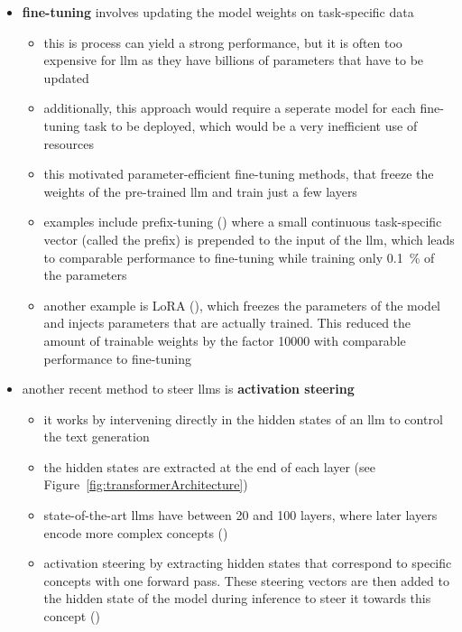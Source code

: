\begin{itemize}
\begin{itemize}
        \end{itemize}
  \item \textbf{fine-tuning} involves updating the model weights on task-specific data
        \begin{itemize}
          \item this is process can yield a strong performance, but it is often too expensive for \acs{llm} as they have billions of parameters that have to be updated
          \item additionally, this approach would require a seperate model for each fine-tuning task to be deployed, which would be a very inefficient use of resources
          \item this motivated parameter-efficient fine-tuning methods, that freeze the weights of the pre-trained \ac{llm} and train just a few layers
          \item examples include prefix-tuning (\cite{liPrefixtuningOptimizingContinuous2021}) where a small continuous task-specific vector (called the prefix) is prepended to the input of the \ac{llm}, which leads to comparable performance to fine-tuning while training only \SI{0.1}{\percent} of the parameters
          \item another example is LoRA (\cite{huLoRALowrankAdaptation2021}), which freezes the parameters of the model and injects parameters that are actually trained. This reduced the amount of trainable weights by the factor \num{10000} with comparable performance to fine-tuning
        \end{itemize}
  \item another recent method to steer \acp{llm} is \textbf{activation steering}
        \begin{itemize}
          \item it works by intervening directly in the hidden states of an \acs{llm} to control the text generation
          \item the hidden states are extracted at the end of each layer (see Figure~\ref{fig:transformerArchitecture})
          \item state-of-the-art \acp{llm} have between \num{20} and \num{100} layers, where later layers encode more complex concepts (\cite{bogdanEmergentEffectsScaling2025})
          \item activation steering by extracting hidden states that correspond to specific concepts with one forward pass. These steering vectors are then added to the hidden state of the model during inference to steer it towards this concept (\cite{konenStyleVectorsSteering2024,turnerActivationAdditionSteering2024,subramaniExtractingLatentSteering2022})
        \end{itemize}

\end{itemize}



